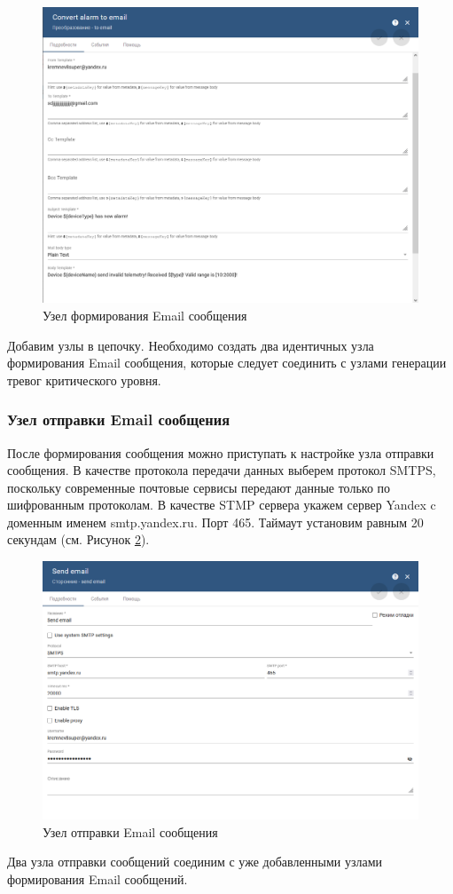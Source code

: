 \documentclass[a4paper,14pt]{extarticle}
\begin{document}
 
\begin{figure}[h!]
	\centering
	\includegraphics[width=1\linewidth]{images/to-email-params}
	\caption{Узел формирования Email сообщения}
	\label{fig:to-email-params}
\end{figure}

Добавим узлы в цепочку. Необходимо создать два идентичных узла формирования Email сообщения, которые следует соединить с узлами генерации тревог критического уровня.



\subsubsection*{Узел отправки Email сообщения}
\label{sec:send-email}
После формирования сообщения можно приступать к настройке узла отправки сообщения. В качестве протокола передачи данных выберем протокол SMTPS, поскольку
современные почтовые сервисы передают данные только по шифрованным протоколам.
В качестве STMP сервера укажем сервер Yandex c доменным именем smtp.yandex.ru. Порт 465. Таймаут установим равным 20 секундам (см. Рисунок \ref{fig:send-email-params}).

\begin{figure}[h!]
	\centering
	\includegraphics[width=0.83\linewidth]{images/send-email-params}
	\caption{Узел отправки Email сообщения}
	\label{fig:send-email-params}
\end{figure}
Два узла отправки сообщений соединим с уже добавленными узлами формирования Email сообщений.
\end{document}
